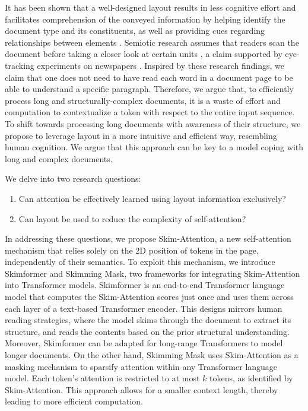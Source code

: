 It has been shown that a well-designed layout results in less cognitive effort \citep{kieras1978beyond, britton1982effects, olive2017processing} and facilitates comprehension of the conveyed information by helping identify the document type and its constituents, as well as providing cues regarding relationships between elements \citep{meyer1980use, wright1999psychology}. Semiotic research assumes that readers scan the document before taking a closer look at certain units \citep{kress1996reading}, a claim supported by eye-tracking experiments on newspapers \citep{leckner2012presentation}. Inspired by these research findings, we claim that one does not need to have read each word in a document page to be able to understand a specific paragraph. Therefore, we argue that, to efficiently process long and structurally-complex documents, it is a waste of effort and computation to contextualize a token with respect to the entire input sequence. To shift towards processing long documents with awareness of their structure, we propose to leverage layout in a more intuitive and efficient way, resembling human cognition. We argue that this approach can be key to a model coping with long and complex documents.

We delve into two research questions:

\begin{enumerate}
    \item Can attention be effectively learned using layout information exclusively?
    \item Can layout be used to reduce the complexity of self-attention?
\end{enumerate}

In addressing these questions, we propose Skim-Attention, a new self-attention mechanism that relies solely on the 2D position of tokens in the page, independently of their semantics. To exploit this mechanism, we introduce Skimformer and Skimming Mask, two frameworks for integrating Skim-Attention into Transformer models. Skimformer is an end-to-end Transformer language model that computes the Skim-Attention scores just once and uses them across each layer of a text-based Transformer encoder. This designs mirrors human reading strategies, where the model skims through the document to extract its structure, and reads the contents based on the prior structural understanding. Moreover, Skimformer can be adapted for long-range Transformers to model longer documents. On the other hand, Skimming Mask uses Skim-Attention as a masking mechanism to sparsify attention within any Transformer language model. Each token's attention is restricted to at most $k$ tokens, as identified by Skim-Attention. This approach allows for a smaller context length, thereby leading to more efficient computation.

